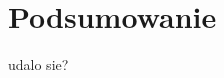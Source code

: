 \documentclass[onecolumn,12pt]{article}
\begin{document}
\section{Podsumowanie}
udalo sie? 


\begin{thebibliography}{9}

\end{thebibliography}
\end{document}
